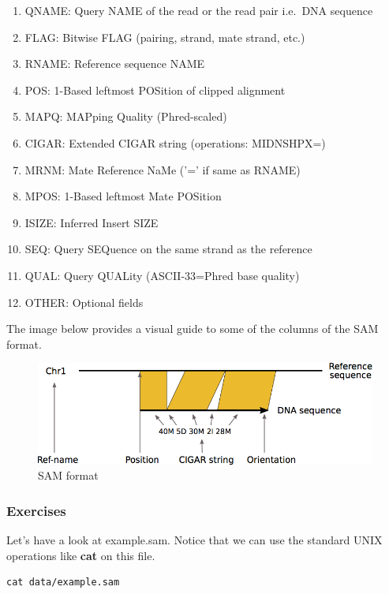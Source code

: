 \documentclass[11pt]{article}
\makeatletter
\providecommand{\tightlist}{%
      \setlength{\itemsep}{0pt}\setlength{\parskip}{0pt}}
\newcommand{\boxspacing}{\kern\kvtcb@left@rule\kern\kvtcb@boxsep}
\newcommand{\prompt}[4]{
        {\ttfamily\llap{{\color{blue}\LARGE\faKeyboardO\hspace{3pt}#4}}\vspace{-\baselineskip}}
    }
\makeatother
\begin{document}
\begin{enumerate}
\def\labelenumi{\arabic{enumi}.}
\tightlist
\item
  QNAME: Query NAME of the read or the read pair i.e.~DNA sequence
\item
  FLAG: Bitwise FLAG (pairing, strand, mate strand, etc.)
\item
  RNAME: Reference sequence NAME
\item
  POS: 1-Based leftmost POSition of clipped alignment
\item
  MAPQ: MAPping Quality (Phred-scaled)
\item
  CIGAR: Extended CIGAR string (operations: MIDNSHPX=)
\item
  MRNM: Mate Reference NaMe ('=' if same as RNAME)
\item
  MPOS: 1-Based leftmost Mate POSition
\item
  ISIZE: Inferred Insert SIZE
\item
  SEQ: Query SEQuence on the same strand as the reference
\item
  QUAL: Query QUALity (ASCII-33=Phred base quality)
\item
  OTHER: Optional fields
\end{enumerate}

The image below provides a visual guide to some of the columns of the
SAM format.

    \begin{figure}[!h]
\centering
\includegraphics{img/SAM_BAM.png}
\caption{SAM format}
\end{figure}

    \hypertarget{exercises}{%
\subsubsection{Exercises}\label{exercises}}

Let's have a look at example.sam. Notice that we can use the standard
UNIX operations like \textbf{cat} on this file.

    \begin{tcolorbox}[breakable, size=fbox, boxrule=1pt, pad at break*=1mm,colback=cellbackground, colframe=cellborder]
\prompt{In}{incolor}{ }{\boxspacing}
\begin{Verbatim}[commandchars=\\\{\}]
cat data/example.sam
\end{Verbatim}
\end{tcolorbox}
\end{document}
